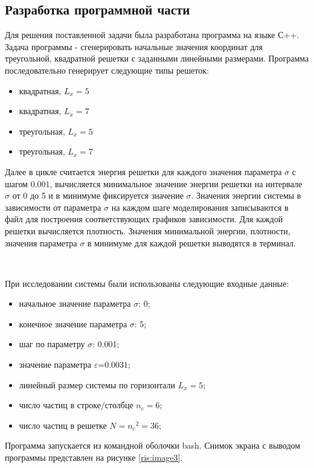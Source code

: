 \documentclass[14pt,a4paper,report]{ncc}
\begin{document}
\subsection{Разработка программной части}
Для решения поставленной задачи была разработана программа на языке С++. Задача программы - сгенерировать начальные значения координат для треугольной, квадратной решетки с заданными линейными размерами.
Программа последовательно генерирует следующие типы решеток:
\begin{itemize}
\item квадратная, {$L_x=5$}
\item квадратная, {$L_x=7$}
\item треугольная, {$L_x=5$}
\item треугольная, {$L_x=7$}
\end{itemize}
Далее в цикле считается энергия решетки для каждого значения параметра $\sigma$ с шагом $0.001$, вычисляется минимальное значение энергии решетки на интервале $\sigma$ от 0 до 5 и в минимуме фиксируется значение $\sigma$. Значения энергии системы в зависимости от параметра $\sigma$ на каждом шаге моделирования записываются в файл для построения соответствующих графиков зависимости. Для каждой решетки вычисляется плотность. 
Значения минимальной энергии, плотности, значения параметра $\sigma$ в минимуме для каждой решетки выводятся в терминал. 

\ 

При исследовании системы были использованы следующие входные данные:
\begin{itemize}
\item начальное значение параметра $\sigma$: 0;
\item конечное значение параметра $\sigma$: 5;
\item шаг по параметру $\sigma$: 0.001;
\item значение параметра $\varepsilon$=$0.0031$;
\item линейный размер системы по горизонтали ${L_x=5}$;
\item число частиц в строке/столбце ${n_c=6}$;
\item число частиц в решетке ${N={n_c}^2=36}$;
\end{itemize}

Программа запускается из командной оболочки bash. Снимок экрана с выводом программы представлен на рисунке \ref{ris:image3}.
\
\end{document}
